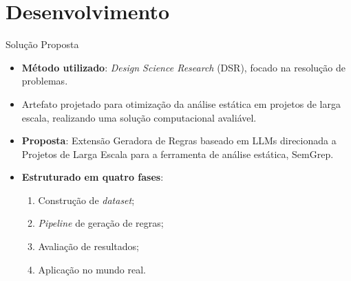 \documentclass[
    aspectratio=169,   %
    12pt,
    brazil
]{beamer}
\newcommand{\minhaspaginas}{}
\begin{document}
\section{Desenvolvimento}

\renewcommand{\minhaspaginas}{\small 45}
\begin{frame}{Solução Proposta}
  \begin{itemize}
    \item \textbf{Método utilizado}: 
      \textit{Design Science Research} (DSR), focado na resolução de problemas.
    \item Artefato projetado para otimização da análise estática em projetos de larga escala, realizando uma solução computacional avaliável.
    \item \textbf{Proposta}:
      Extensão Geradora de Regras baseado em LLMs direcionada a Projetos de Larga Escala para a ferramenta de análise estática, SemGrep.
    \item \textbf{Estruturado em quatro fases}:
      \begin{enumerate}
        \item Construção de \textit{dataset};
        \item \textit{Pipeline} de geração de regras;
        \item Avaliação de resultados;
        \item Aplicação no mundo real.
      \end{enumerate}
  \end{itemize}
\end{frame}
\end{document}
